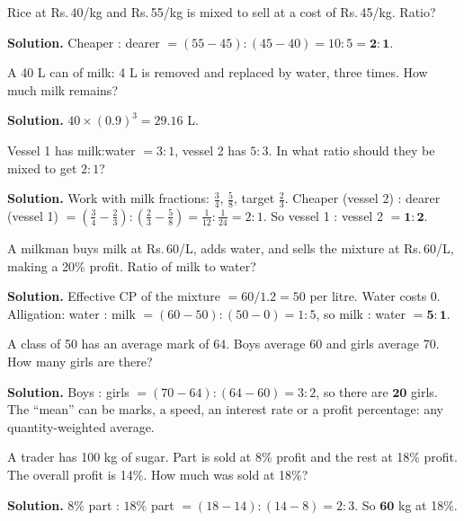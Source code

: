 \documentclass[11pt,a4paper,openany]{report}
\newcommand{\Rs}{Rs.\,}
\begin{document}
\begin{example}
Rice at \Rs40/kg and \Rs55/kg is mixed to sell at a cost of \Rs45/kg. Ratio?

\textbf{Solution.} Cheaper : dearer $=(55-45):(45-40)=10:5=\mathbf{2:1}$.
\end{example}

\begin{example}[replacement]
A 40 L can of milk: 4 L is removed and replaced by water, three times. How much milk remains?

\textbf{Solution.} $40\times(0.9)^3=\mathbf{29.16}$ L.
\end{example}

\begin{example}
Vessel 1 has milk:water $=3:1$, vessel 2 has $5:3$. In what ratio should they be mixed to get $2:1$?

\textbf{Solution.} Work with milk fractions: $\frac34$, $\frac58$, target $\frac23$. Cheaper (vessel 2) : dearer (vessel 1)
$=(\frac34-\frac23):(\frac23-\frac58)=\frac1{12}:\frac1{24}=2:1$. So vessel 1 : vessel 2 $=\mathbf{1:2}$.
\end{example}

\begin{example}
A milkman buys milk at \Rs60/L, adds water, and sells the mixture at \Rs60/L, making a 20\% profit. Ratio of milk to water?

\textbf{Solution.} Effective CP of the mixture $=60/1.2=50$ per litre. Water costs 0. Alligation:
water : milk $=(60-50):(50-0)=1:5$, so milk : water $=\mathbf{5:1}$.
\end{example}
\begin{example}
A class of 50 has an average mark of 64. Boys average 60 and girls average 70. How many girls are there?

\textbf{Solution.} Boys : girls $=(70-64):(64-60)=3:2$, so there are $\mathbf{20}$ girls. The ``mean'' can be marks, a speed, an interest rate or a profit percentage: any quantity-weighted average.
\end{example}

\begin{example}
A trader has 100 kg of sugar. Part is sold at 8\% profit and the rest at 18\% profit. The overall profit is 14\%. How much was sold at 18\%?

\textbf{Solution.} $8\%$ part : $18\%$ part $=(18-14):(14-8)=2:3$. So $\mathbf{60}$ kg at 18\%.
\end{example}
\end{document}
